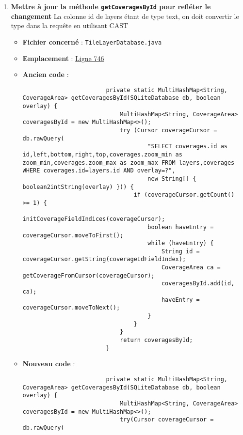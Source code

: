 \begin{enumerate}
    \item \textbf{Mettre à jour la méthode \texttt{getCoveragesById} pour refléter le changement}
          La colonne id de layers étant de type text, on doit convertir le type dans la requête en utilisant CAST
          \begin{itemize}
              \item \textbf{Fichier concerné} : \texttt{TileLayerDatabase.java}
              \item \textbf{Emplacement} :
                    \href{https://github.com/MarcusWolschon/osmeditor4android/blob/master/src/main/java/de/blau/android/resources/TileLayerDatabase.java#L746}{Ligne 746}
              \item \textbf{Ancien code} :
                    \begin{verbatim}
                        private static MultiHashMap<String, CoverageArea> getCoveragesById(SQLiteDatabase db, boolean overlay) {
                            MultiHashMap<String, CoverageArea> coveragesById = new MultiHashMap<>();
                            try (Cursor coverageCursor = db.rawQuery(
                                    "SELECT coverages.id as id,left,bottom,right,top,coverages.zoom_min as zoom_min,coverages.zoom_max as zoom_max FROM layers,coverages WHERE coverages.id=layers.id AND overlay=?",
                                    new String[] { boolean2intString(overlay) })) {
                                if (coverageCursor.getCount() >= 1) {
                                    initCoverageFieldIndices(coverageCursor);
                                    boolean haveEntry = coverageCursor.moveToFirst();
                                    while (haveEntry) {
                                        String id = coverageCursor.getString(coverageIdFieldIndex);
                                        CoverageArea ca = getCoverageFromCursor(coverageCursor);
                                        coveragesById.add(id, ca);
                                        haveEntry = coverageCursor.moveToNext();
                                    }
                                }
                            }
                            return coveragesById;
                        }
                    \end{verbatim}
              \item \textbf{Nouveau code} :
                    \begin{verbatim}
                        private static MultiHashMap<String, CoverageArea> getCoveragesById(SQLiteDatabase db, boolean overlay) {
                            MultiHashMap<String, CoverageArea> coveragesById = new MultiHashMap<>();
                            try(Cursor coverageCursor = db.rawQuery(


\end{verbatim}
\end{itemize}
\end{enumerate}
